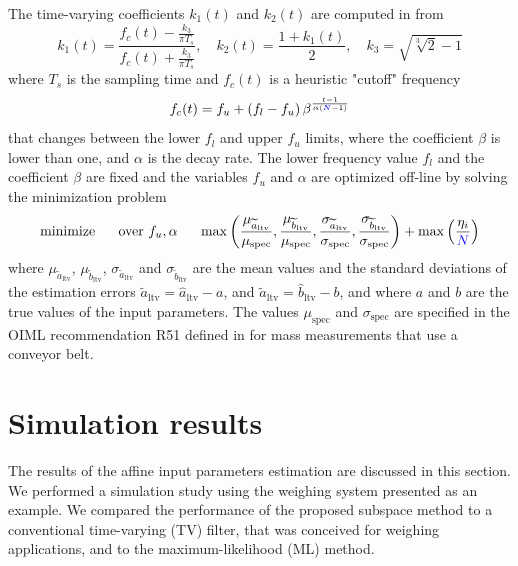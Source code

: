 The time-varying coefficients $k_1(t)$ and $k_2(t)$ are computed in \citet{Pietrzak14} from 
\begin{equation} k_1(t) = \frac{f_c(t) - \frac{k_3}{\pi T_s}}{f_c(t) + \frac{k_3}{\pi T_s}}, \quad k_2(t) = \frac{1 + k_1(t)}{2} , \quad k_3 = \sqrt{ \sqrt[3]{2}  - 1} \end{equation}
where $T_s$ is the sampling time and $f_c(t)$ is a heuristic "cutoff" frequency
\begin{equation} f_c(t) = f_u + \left( f_l - f_u \right) \beta^{\frac{t-1}{\alpha \left( \color{blue}N\color{black}-1 \right)} } \end{equation}
that changes between the lower $f_l$ and upper $f_u$ limits, where the coefficient $\beta$ is lower than one, and $\alpha$ is the decay rate. 
The lower frequency value $f_l$ and the coefficient $\beta$ are fixed and the variables $f_u$ and $\alpha$ are optimized off-line by solving the minimization problem 
\begin{equation} \mathrm{minimize} \ \quad \ \mathrm{over} \ f_u, \alpha \ \quad \ \mathrm{max} \left( \dfrac{\mu_{\widetilde{a}_{\mathrm{ltv}}}}{\mu_{\mathrm{spec}}}, \dfrac{\mu_{\widetilde{b}_{\mathrm{ltv}}}}{\mu_{\mathrm{spec}}}, \dfrac{\sigma_{\widetilde{a}_{\mathrm{ltv}}}}{\sigma_{\mathrm{spec}}}, \dfrac{\sigma_{\widetilde{b}_{\mathrm{ltv}}}}{\sigma_{\mathrm{spec}}} \right) + \mathrm{max} \left( \dfrac{\eta_{i}}{\color{blue}N\color{black}} \right) \label{eqn:tv_optim} \end{equation}
where $\mu_{\widetilde{a}_\mathrm{ltv}}$, $\mu_{\widetilde{b}_\mathrm{ltv}}$, $\sigma_{\widetilde{a}_\mathrm{ltv}}$ and $\sigma_{\widetilde{b}_\mathrm{ltv}}$ are the mean values and the standard deviations of the estimation errors $\widetilde{a}_\mathrm{ltv} = \widehat{a}_\mathrm{ltv} - {a}$, and $\widetilde{a}_\mathrm{ltv} = \widehat{b}_\mathrm{ltv} - {b}$, and where ${a}$ and ${b}$ are the true values of the input parameters.
The values $\mu_{\mathrm{spec}}$ and $\sigma_{\mathrm{spec}}$ are specified in the OIML recommendation R51 defined in \citet{OIML_R51_1} for mass measurements that use a conveyor belt.


\section{Simulation results}
The results of the affine input parameters estimation are discussed in this section.
We performed a simulation study using the weighing system presented as an example.
We compared the performance of the proposed subspace method to a conventional time-varying (TV) filter, that was conceived for weighing applications, and to the maximum-likelihood (ML) method.

